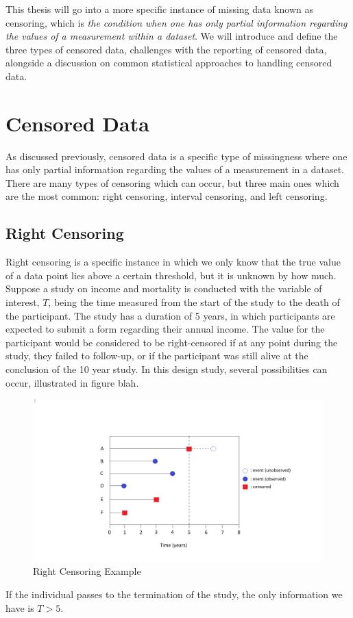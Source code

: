 \documentclass[12pt, twoside]{amherstthesis}
\begin{document}
This thesis will go into a more specific instance of missing data known as censoring, which is \emph{the condition when one has only partial information regarding the values of a measurement within a dataset}. We will introduce and define the three types of censored data, challenges with the reporting of censored data, alongside a discussion on common statistical approaches to handling censored data.

\hypertarget{censored_data}{%
\section{Censored Data}\label{censored_data}}

As discussed previously, censored data is a specific type of missingness where one has only partial information regarding the values of a measurement in a dataset. There are many types of censoring which can occur, but three main ones which are the most common: right censoring, interval censoring, and left censoring.

\hypertarget{right}{%
\subsection{Right Censoring}\label{right}}

Right censoring is a specific instance in which we only know that the true value of a data point lies above a certain threshold, but it is unknown by how much. Suppose a study on income and mortality is conducted with the variable of interest, \(T\), being the time measured from the start of the study to the death of the participant. The study has a duration of 5 years, in which participants are expected to submit a form regarding their annual income. The value for the participant would be considered to be right-censored if at any point during the study, they failed to follow-up, or if the participant was still alive at the conclusion of the 10 year study. In this design study, several possibilities can occur, illustrated in figure blah.
\begin{figure}

{\centering \includegraphics[width=1\linewidth]{figures/right_censoring_example} 

}

\caption{Right Censoring Example}\label{fig:rightcensoringexample}
\end{figure}
If the individual passes to the termination of the study, the only information we have is \(T > 5\).
\end{document}
